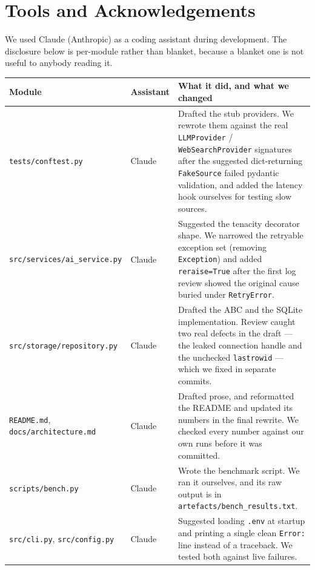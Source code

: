 \documentclass[11pt,a4paper]{article}
\begin{document}
\section{Tools and Acknowledgements}\label{sec:tools}

We used Claude (Anthropic) as a coding assistant during development. The disclosure below is
per-module rather than blanket, because a blanket one is not useful to anybody reading it.

\begin{center}\small
\begin{tabularx}{\textwidth}{@{}llX@{}}
\toprule
\textbf{Module} & \textbf{Assistant} & \textbf{What it did, and what we changed} \\
\midrule
\texttt{tests/conftest.py} & Claude & Drafted the stub providers. We rewrote them against the real
\texttt{LLMProvider} / \texttt{WebSearchProvider} signatures after the suggested dict-returning
\texttt{FakeSource} failed pydantic validation, and added the latency hook ourselves for testing slow
sources. \\
\texttt{src/services/ai\_service.py} & Claude & Suggested the tenacity decorator shape. We
narrowed the retryable exception set (removing \texttt{Exception}) and added
\texttt{reraise=True} after the first log review showed the original cause buried under
\texttt{RetryError}. \\
\texttt{src/storage/repository.py} & Claude & Drafted the ABC and the SQLite implementation.
Review caught two real defects in the draft --- the leaked connection handle and the unchecked
\texttt{lastrowid} --- which we fixed in separate commits. \\
\texttt{README.md}, \texttt{docs/architecture.md} & Claude & Drafted prose, and reformatted the
README and updated its numbers in the final rewrite. We checked every number against our own runs
before it was committed. \\
\texttt{scripts/bench.py} & Claude & Wrote the benchmark script. We ran it ourselves, and its raw
output is in \texttt{artefacts/bench\_results.txt}. \\
\texttt{src/cli.py}, \texttt{src/config.py} & Claude & Suggested loading \texttt{.env} at startup
and printing a single clean \texttt{Error:} line instead of a traceback. We tested both against
live failures. \\
\bottomrule
\end{tabularx}
\end{center}
\end{document}
